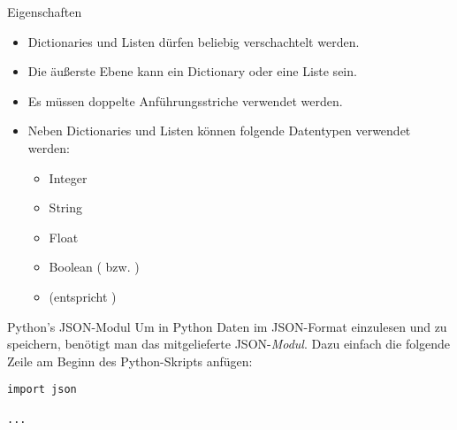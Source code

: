\begin{frame}
\begin{block}{Eigenschaften}
\vspace{2pt}
\pause 
\begin{itemize}[<+->]
	\item Dictionaries und Listen dürfen beliebig verschachtelt werden. 
	\item Die äußerste Ebene kann ein Dictionary oder eine Liste sein. 
	\item Es müssen doppelte Anführungsstriche verwendet werden. 
	\item Neben Dictionaries und Listen können folgende Datentypen verwendet werden: 
	\begin{itemize}
		\item Integer
		\item String
		\item Float
		\item Boolean ( bzw. )
		\item {} (entspricht )
	\end{itemize}
\end{itemize}
\end{block}
\end{frame}


\begin{fragile}
	
\begin{block}{Python's JSON-Modul}
\vspace{2pt}
Um in Python Daten im JSON-Format einzulesen und zu speichern, benötigt man das mitgelieferte JSON-\emph{Modul}. 
Dazu einfach die folgende Zeile am Beginn des Python-Skripts anfügen: 

\pause 

\begin{verbatim}
import json 

...


\end{verbatim}
\end{block}	

\end{fragile}


